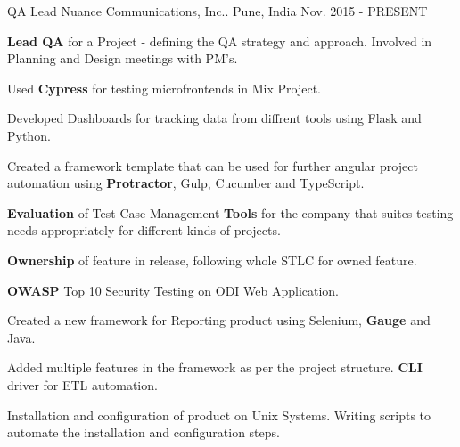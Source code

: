 

\begin{cventries}

  \cventry
    {QA Lead} %
    {Nuance Communications, Inc..} %
    {Pune, India} %
    {Nov. 2015 - PRESENT} %
    {
      \begin{cvitems} %
	    \item {\textbf{Lead QA} for a Project - defining the QA strategy and approach. Involved in Planning and Design meetings with PM's.}
	    \item Used \textbf{Cypress} for testing microfrontends in Mix Project.
	    \item Developed Dashboards for tracking data from diffrent tools using Flask and Python.
		\item {Created a framework template that can be used for further angular project automation using \textbf{Protractor}, Gulp, Cucumber and TypeScript.}
		\item {\textbf{Evaluation} of Test Case Management \textbf{Tools} for the company that suites testing needs appropriately for different kinds of projects.}
        \item {\textbf{Ownership} of feature in release, following whole STLC for owned feature.}
		\item {\textbf{OWASP} Top 10 Security Testing on ODI Web Application.}
        \item {Created a new framework for Reporting product using Selenium, \textbf{Gauge} and Java.}
        \item {Added multiple features in the framework as per the project structure. \textbf{CLI} driver for ETL automation.}
        \item {Installation and configuration of product on Unix Systems. Writing scripts to automate the installation and configuration steps.}
      \end{cvitems}
    }


\end{cventries}
